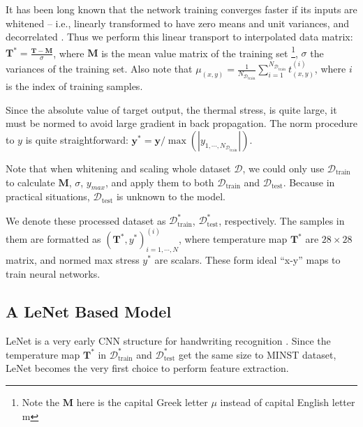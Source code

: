\begin{description}[labelsep=0.5em]
    \item[Whitening Input] It has been long known that the network training converges faster 
    if its inputs are whitened – i.e., 
    linearly transformed to have zero means and unit variances, and decorrelated \cite{orr2003neural}.
    Thus we perform this linear transport to interpolated data matrix: 
    $\mathbf{T}^* = \frac{\mathbf{T} - \mathbf{M}}{\sigma}$, 
    where $\mathbf{M}$ is the mean value matrix of the training set \footnote{Note the $\mathbf{M}$
    here is the capital Greek letter $\mu$ instead of capital English letter m},
    $\sigma$ the variances of the training set.
    Also note that $\mu_{\left(x,y\right)} = \frac{1}{N_{\mathcal{D}_{\textrm{train}}}} \sum_{i=1}^{N_{\mathcal{D}_{\textrm{train}}}} 
    t^{\left(i\right)}_{\left(x,y\right)}$, where $i$ is the index of training samples.
    
    \item[Scaling Output] Since the absolute value of target output, the thermal stress, is
    quite large, it must be normed to avoid large gradient in back propagation.
    The norm procedure to $y$ is quite straightforward:
    $\mathbf{y}^* = \mathbf{y} / \max \left(\left|y_{1,\cdots,N_{\mathcal{D}_{\textrm{train}}}}\right|\right)$.
\end{description}
Note that when whitening and scaling whole dataset $\mathcal{D}$, we could only use
$\mathcal{D}_{\textrm{train}}$ to calculate $\mathbf{M}$, $\sigma$, $y_{max}$, and apply them
to both $\mathcal{D}_{\textrm{train}}$ and $\mathcal{D}_{\textrm{test}}$. Because in practical situations,
$\mathcal{D}_{\textrm{test}}$ is unknown to the model.

We denote these processed dataset as $\mathcal{D}_{\textrm{train}}^*$, $\mathcal{D}_{\textrm{test}}^*$, respectively.
The samples in them are formatted as $\left(\mathbf{T}^*, y^*\right)^{(i)}_{i=1,\cdots, N}$,
where temperature map $\mathbf{T}^*$ are $28 \times 28$ matrix, and normed max stress $y ^ *$ are scalars.
These form ideal ``x-y'' maps to train neural networks.

\subsection{A LeNet Based Model}
LeNet is a very early CNN structure for handwriting recognition \cite{lecun1998gradient}. Since the temperature map
$\mathbf{T}^*$ in $\mathcal{D}_{\textrm{train}}^*$ and $\mathcal{D}_{\textrm{test}}^*$ get the same size to MINST dataset,
LeNet becomes the very first choice to perform feature extraction. 


